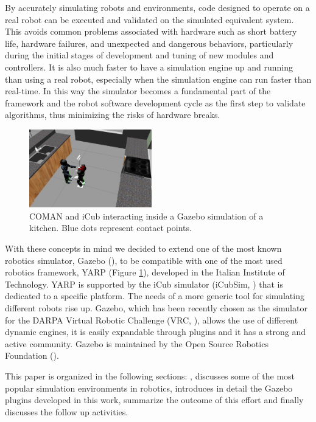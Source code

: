 By accurately simulating robots and environments, code designed to operate on a real robot can be executed and validated on the simulated equivalent system. This avoids common problems associated with hardware such as short battery life, hardware failures, and unexpected and dangerous behaviors, particularly during the initial stages of development and tuning of new modules and controllers. 
It is also much faster to have a simulation engine up and running than using a real robot, especially when the simulation engine can run faster than real-time. In this way the simulator becomes a fundamental part of the framework and the robot software development cycle as the first step to validate algorithms, thus minimizing the risks of hardware breaks.

\begin{figure}[h!]
  \centering
    \includegraphics[width=0.475\textwidth]{images/coman_icub_gazebo.jpg}
    \caption{COMAN and iCub interacting inside a Gazebo simulation of a kitchen. Blue dots represent contact points.}\label{coman_icub_gazebo}
\end{figure}

With these concepts in mind we decided to extend one of the most known robotics simulator, Gazebo (\cite{koenig2004design}), to be compatible with one of the most used robotics framework, YARP (Figure \ref{coman_icub_gazebo}), developed in the Italian Institute of Technology. 
YARP is supported by the iCub simulator (iCubSim, \cite{Tikhanoff:2008:OSC:1774674.1774684}) that is dedicated to a specific platform. The needs of a more generic tool for simulating different robots rise up. 
Gazebo, which has been recently chosen as the simulator for the DARPA Virtual Robotic Challenge (VRC, \cite{DRC}), allows the use of different dynamic engines, it is easily expandable through plugins and it has a strong and active community. Gazebo is maintained by the Open Source Robotics Foundation (\cite{OSRF}).

This paper is organized in the following sections: \textbf{}, discusses some of the most popular simulation environments in robotics, \textbf{} introduces in detail the Gazebo plugins developed in this work, \textbf{} summarize the outcome of this effort and finally \textbf{} discusses the follow up activities.  



